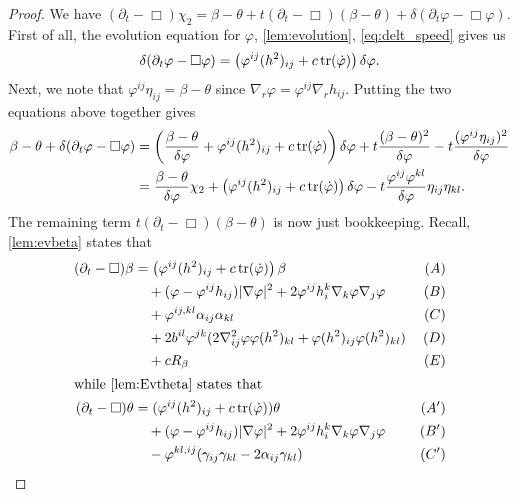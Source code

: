 \documentclass{amsart}
\begin{document}
\begin{proof}
We have
$
(\partial_t - \Box)\chi_2 = \beta - \theta + t(\partial_{t} - \Box)(\beta - \theta) + \delta(\partial_t \varphi - \Box\varphi).
$
First of all, the evolution equation for \(\varphi\), \cref{lem:evolution}, \cref{eq:delt_speed} gives us
\[
\delta(\partial_t \varphi - \Box\varphi) = \left(\varphi^{ij}(h^2)_{ij} + c\operatorname{tr}(\dot{\varphi})\right)\delta\varphi.
\]
Next, we note that
$
\varphi^{ij} \eta_{ij} = \beta - \theta
$
since \(\nabla_r \varphi = \varphi^{ij} \nabla_r h_{ij}\). Putting the two equations above together gives
\begin{equation}
\label{eq:deltchi1}
\begin{split}
\beta - \theta + \delta(\partial_t \varphi - \Box\varphi) &= \left(\frac{\beta-\theta}{\delta\varphi} + \varphi^{ij}(h^2)_{ij} + c\operatorname{tr}(\dot{\varphi})\right)\delta\varphi + t \frac{(\beta - \theta)^2}{\delta\varphi} - t \frac{(\varphi^{ij}\eta_{ij})^2}{\delta\varphi} \\
&= \frac{\beta-\theta}{\delta\varphi} \chi_2 + \left(\varphi^{ij}(h^2)_{ij} + c\operatorname{tr}(\dot{\varphi})\right)\delta\varphi  - t \frac{\varphi^{ij}\varphi^{kl}}{\delta\varphi} \eta_{ij}\eta_{kl}.
\end{split}
\end{equation}
The remaining term \(t(\partial_{t} - \Box)(\beta - \theta)\) is now just bookkeeping. Recall, \cref{lem:evbeta} states that
\begin{align*}
(\partial_{t} - \Box)\beta &= \left(\varphi^{ij}(h^2)_{ij} + c\operatorname{tr}(\dot{\p}) \right)\beta  & (A) \\
&\quad + (\varphi - \varphi^{ij}h_{ij}) |\nabla\varphi|^{2} + 2\varphi^{ij}h^{k}_{i}\nabla_k \varphi \nabla_j \varphi  & (B) \\
&\quad + \varphi^{ij,kl} \a_{ij} \a_{kl} & (C) \\
&\quad + 2b^{il}\varphi^{jk} (2\nabla^2_{ij}\varphi\varphi(h^2)_{kl} + \varphi(h^2)_{ij}\varphi(h^2)_{kl}) & (D) \\
&\quad + cR_{\beta}  & (E) \\
\intertext{while \cref{lem:Evtheta} states that}
(\partial_{t} - \Box)\theta &= (\varphi^{ij}(h^2)_{ij} + c\operatorname{tr}(\dot{\p}))\theta & (A') \\
&\quad + (\varphi - \varphi^{ij}h_{ij})|\nabla\varphi|^{2} + 2\varphi^{ij}h^{k}_{i}\nabla_k\varphi\nabla_j\varphi & (B') \\
&\quad - \varphi^{kl,ij} (\gamma_{ij}\gamma_{kl}  - 2\a_{ij} \gamma_{kl}) & (C') \\

\end{align*}
\end{proof}
\end{document}
